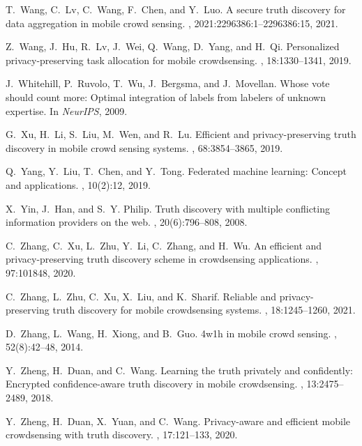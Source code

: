 \documentclass[11pt]{article}
\begin{document}
\begin{thebibliography}{10}
T.~Wang, C.~Lv, C.~Wang, F.~Chen, and Y.~Luo.
\newblock A secure truth discovery for data aggregation in mobile crowd
  sensing.
, 2021:2296386:1--2296386:15, 2021.

Z.~Wang, J.~Hu, R.~Lv, J.~Wei, Q.~Wang, D.~Yang, and H.~Qi.
\newblock Personalized privacy-preserving task allocation for mobile
  crowdsensing.
, 18:1330--1341, 2019.

J.~Whitehill, P.~Ruvolo, T.~Wu, J.~Bergsma, and J.~Movellan.
\newblock Whose vote should count more: Optimal integration of labels from
  labelers of unknown expertise.
\newblock In {\em NeurIPS}, 2009.

G.~Xu, H.~Li, S.~Liu, M.~Wen, and R.~Lu.
\newblock Efficient and privacy-preserving truth discovery in mobile crowd
  sensing systems.
, 68:3854--3865, 2019.

Q.~Yang, Y.~Liu, T.~Chen, and Y.~Tong.
\newblock Federated machine learning: Concept and applications.
,
  10(2):12, 2019.

X.~Yin, J.~Han, and S.~Y. Philip.
\newblock Truth discovery with multiple conflicting information providers on
  the web.
,
  20(6):796--808, 2008.

C.~Zhang, C.~Xu, L.~Zhu, Y.~Li, C.~Zhang, and H.~Wu.
\newblock An efficient and privacy-preserving truth discovery scheme in
  crowdsensing applications.
, 97:101848, 2020.

C.~Zhang, L.~Zhu, C.~Xu, X.~Liu, and K.~Sharif.
\newblock Reliable and privacy-preserving truth discovery for mobile
  crowdsensing systems.
,
  18:1245--1260, 2021.

D.~Zhang, L.~Wang, H.~Xiong, and B.~Guo.
\newblock 4w1h in mobile crowd sensing.
, 52(8):42--48, 2014.

Y.~Zheng, H.~Duan, and C.~Wang.
\newblock Learning the truth privately and confidently: Encrypted
  confidence-aware truth discovery in mobile crowdsensing.
,
  13:2475--2489, 2018.

Y.~Zheng, H.~Duan, X.~Yuan, and C.~Wang.
\newblock Privacy-aware and efficient mobile crowdsensing with truth discovery.
,
  17:121--133, 2020.

\end{thebibliography}
\end{document}
